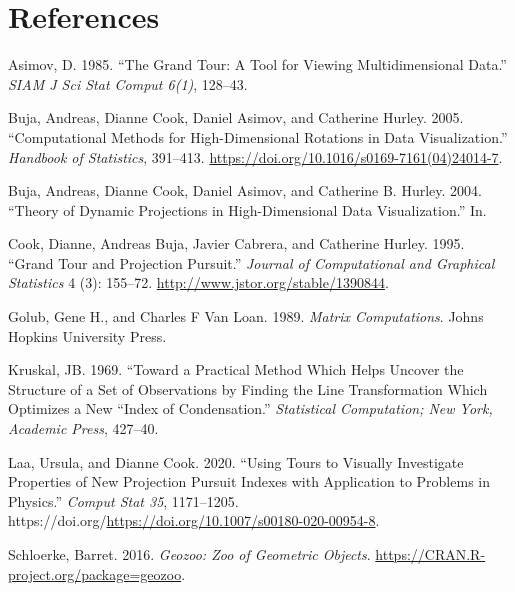 \hypertarget{references}{%
\section*{References}\label{references}}

\hypertarget{refs}{}
\begin{CSLReferences}{1}{0}
\leavevmode{}%
Asimov, D. 1985. {``The Grand Tour: A Tool for Viewing Multidimensional Data.''} \emph{SIAM J Sci Stat Comput 6(1)}, 128--43.

\leavevmode{}%
Buja, Andreas, Dianne Cook, Daniel Asimov, and Catherine Hurley. 2005. {``Computational Methods for High-Dimensional Rotations in Data Visualization.''} \emph{Handbook of Statistics}, 391--413. \url{https://doi.org/10.1016/s0169-7161(04)24014-7}.

\leavevmode{}%
Buja, Andreas, Dianne Cook, Daniel Asimov, and Catherine B. Hurley. 2004. {``Theory of Dynamic Projections in High-Dimensional Data Visualization.''} In.

\leavevmode{}%
Cook, Dianne, Andreas Buja, Javier Cabrera, and Catherine Hurley. 1995. {``Grand Tour and Projection Pursuit.''} \emph{Journal of Computational and Graphical Statistics} 4 (3): 155--72. \url{http://www.jstor.org/stable/1390844}.

\leavevmode{}%
Golub, Gene H., and Charles F Van Loan. 1989. \emph{Matrix Computations}. Johns Hopkins University Press.

\leavevmode{}%
Kruskal, JB. 1969. {``Toward a Practical Method Which Helps Uncover the Structure of a Set of Observations by Finding the Line Transformation Which Optimizes a New ``Index of Condensation.''} \emph{Statistical Computation; New York, Academic Press}, 427--40.

\leavevmode{}%
Laa, Ursula, and Dianne Cook. 2020. {``Using Tours to Visually Investigate Properties of New Projection Pursuit Indexes with Application to Problems in Physics.''} \emph{Comput Stat 35}, 1171--1205. https://doi.org/\url{https://doi.org/10.1007/s00180-020-00954-8}.

\leavevmode{}%
Schloerke, Barret. 2016. \emph{Geozoo: Zoo of Geometric Objects}. \url{https://CRAN.R-project.org/package=geozoo}.

\end{CSLReferences}

